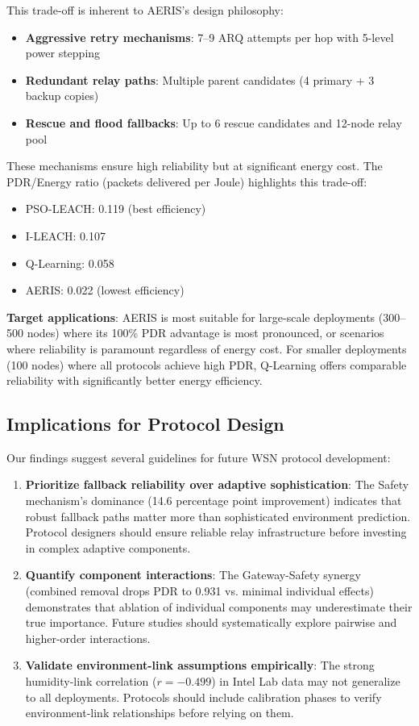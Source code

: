 \documentclass[sensors,article,submit,moreauthors,pdftex]{Definitions/mdpi}
\begin{document}
This trade-off is inherent to AERIS's design philosophy:
\begin{itemize}
\item \textbf{Aggressive retry mechanisms}: 7--9 ARQ attempts per hop with 5-level power stepping
\item \textbf{Redundant relay paths}: Multiple parent candidates (4 primary + 3 backup copies)
\item \textbf{Rescue and flood fallbacks}: Up to 6 rescue candidates and 12-node relay pool
\end{itemize}

These mechanisms ensure high reliability but at significant energy cost. The PDR/Energy ratio (packets delivered per Joule) highlights this trade-off:
\begin{itemize}
\item PSO-LEACH: 0.119 (best efficiency)
\item I-LEACH: 0.107
\item Q-Learning: 0.058
\item AERIS: 0.022 (lowest efficiency)
\end{itemize}

\textbf{Target applications}: AERIS is most suitable for large-scale deployments (300--500 nodes) where its 100\% PDR advantage is most pronounced, or scenarios where reliability is paramount regardless of energy cost. For smaller deployments (100 nodes) where all protocols achieve high PDR, Q-Learning offers comparable reliability with significantly better energy efficiency.

\subsection{Implications for Protocol Design}

Our findings suggest several guidelines for future WSN protocol development:

\begin{enumerate}
\item \textbf{Prioritize fallback reliability over adaptive sophistication}: The Safety mechanism's dominance (14.6 percentage point improvement) indicates that robust fallback paths matter more than sophisticated environment prediction. Protocol designers should ensure reliable relay infrastructure before investing in complex adaptive components.

\item \textbf{Quantify component interactions}: The Gateway-Safety synergy (combined removal drops PDR to 0.931 vs. minimal individual effects) demonstrates that ablation of individual components may underestimate their true importance. Future studies should systematically explore pairwise and higher-order interactions.

\item \textbf{Validate environment-link assumptions empirically}: The strong humidity-link correlation ($r = -0.499$) in Intel Lab data may not generalize to all deployments. Protocols should include calibration phases to verify environment-link relationships before relying on them.
\end{enumerate}
\end{document}
